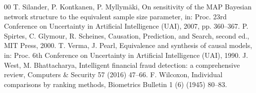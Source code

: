 \documentclass[final,5p,times,authoryear]{elsarticle}
\begin{document}
\begin{thebibliography}{00}
 T. Silander, P. Kontkanen, P. Myllym\"aki, On sensitivity of the MAP Bayesian network structure to the equivalent sample size parameter, in: Proc. 23rd Conference on Uncertainty in Artificial Intelligence (UAI), 2007, pp. 360--367.
 P. Spirtes, C. Glymour, R. Scheines, Causation, Prediction, and Search, second ed., MIT Press, 2000.
 T. Verma, J. Pearl, Equivalence and synthesis of causal models, in: Proc. 6th Conference on Uncertainty in Artificial Intelligence (UAI), 1990.
 J. West, M. Bhattacharya, Intelligent financial fraud detection: a comprehensive review, Computers \& Security 57 (2016) 47--66.
 F. Wilcoxon, Individual comparisons by ranking methods, Biometrics Bulletin 1 (6) (1945) 80--83.
\end{thebibliography}
\endgroup

\end{document}
